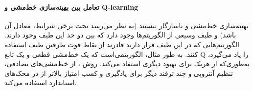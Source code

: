 \paragraph{تعامل بین بهینه‌سازی خط‌مشی و Q-learning}
 بهینه‌سازی خط‌مشی و  
ناسازگار نیستند (به نظر می‌رسد تحت برخی شرایط، معادل آن باشد) و طیف وسیعی از الگوریتم‌ها وجود دارد که بین دو حد این طیف وجود دارند. الگوریتم‌هایی که در این طیف قرار دارند قادرند از نقاط قوت  طرفین طیف استفاده کنند.
  به طور مثال، 
 الگوریتمی‌است که  یک خط‌مشی قطعی و یک تابع Q را یاد می‌گیرد،
 به‌طوری‌که از هریک  برای بهبود دیگری استفاد می‌کند. روش
 ،
   از خط‌مشی‌های تصادفی، تنظیم آنتروپی  و چند ترفند دیگر برای  یادگیری و کسب امتیاز بالاتر از 
    در محک‌های استاندارد
    استفاده می‌کند.


